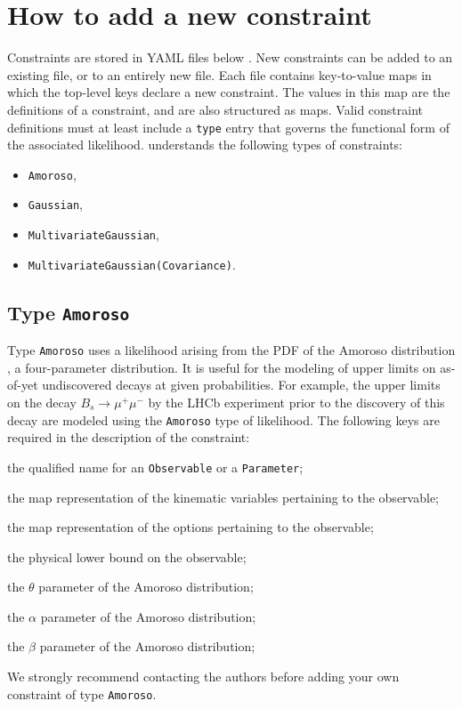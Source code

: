 \section{How to add a new constraint}

Constraints are stored in YAML files below . New constraints can be
added to an existing file, or to an entirely new file. Each file contains key-to-value maps
in which the top-level keys declare a new constraint.
The values in this map are the definitions of a constraint, and are also structured as maps. Valid
constraint definitions must at least include a \texttt{type} entry that governs the functional
form of the associated likelihood. \ctg understands the following types of constraints:
\begin{itemize}[labelwidth=.15\textwidth]
    \item \texttt{Amoroso},
    \item \texttt{Gaussian},
    \item \texttt{MultivariateGaussian},
    \item \texttt{MultivariateGaussian(Covariance)}.
\end{itemize}

\subsection{Type \texttt{Amoroso}}

Type \texttt{Amoroso} uses a likelihood arising from the \gls{PDF} of the
Amoroso distribution \cite{Crooks:2010}, a four-parameter distribution. It is
useful for the modeling of upper limits on as-of-yet undiscovered decays at
given probabilities. For example, the upper limits on the decay $B_s \to
\mu^+\mu^-$ by the LHCb experiment prior to the discovery of this decay are
modeled using the \texttt{Amoroso} type of likelihood. The following keys are
required in the description of the constraint:
\begin{description}[labelwidth=.15\textwidth]
    \item[\texttt{observable}] the qualified name for an \texttt{Observable} or a \texttt{Parameter};
    \item[\texttt{kinematics}] the map representation of the kinematic variables pertaining to the observable;
    \item[\texttt{options}] the map representation of the options pertaining to the observable;
    \item[\texttt{physical-limit}] the physical lower bound on the observable;
    \item[\texttt{theta}] the $\theta$ parameter of the Amoroso distribution;
    \item[\texttt{alpha}] the $\alpha$ parameter of the Amoroso distribution;
    \item[\texttt{beta}] the $\beta$ parameter of the Amoroso distribution;
\end{description}
We strongly recommend contacting the \ctg authors before adding your own constraint of type \texttt{Amoroso}.

